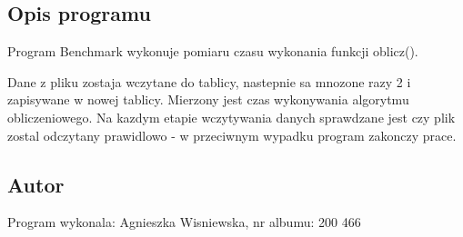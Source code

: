 \hypertarget{index_opis}{}\subsection{Opis programu}\label{index_opis}
Program Benchmark wykonuje pomiaru czasu wykonania funkcji oblicz(). \par
 Dane z pliku zostaja wczytane do tablicy, nastepnie sa mnozone razy 2 i zapisywane w nowej tablicy. Mierzony jest czas wykonywania algorytmu obliczeniowego. Na kazdym etapie wczytywania danych sprawdzane jest czy plik zostal odczytany prawidlowo -\/ w przeciwnym wypadku program zakonczy prace.\hypertarget{index_autor}{}\subsection{Autor}\label{index_autor}
Program wykonala\-: Agnieszka Wisniewska, nr albumu\-: 200 466 